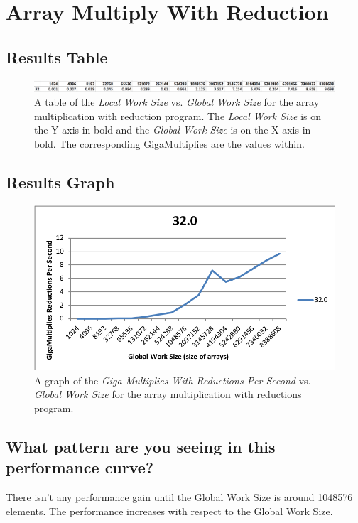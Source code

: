 \documentclass[onecolumn,draftclsnofoot, 10pt, compsoc]{IEEEtran}
\begin{document}
\section{Array Multiply With Reduction}
	\subsection{Results Table}
		\begin{figure}[H]
			\includegraphics[width=18cm]{redTable}
			\centering
			\caption{A table of the \textit{Local Work Size} vs. \textit{Global Work Size} for the array multiplication with reduction program.
				The \textit{Local Work Size} is on the Y-axis in bold and the \textit{Global Work Size} is on the X-axis in bold. The corresponding GigaMultiplies are the values within.}
		\end{figure}
	
	
	
	
	
	\subsection{Results Graph}
		\begin{figure}[H]
			\includegraphics[width=16cm]{redGlobal}
			\centering
			\caption{A graph of the \textit{Giga Multiplies With Reductions Per Second} vs. \textit{Global Work Size} for the array multiplication with reductions program.}
		\end{figure}




	
	
	
	\subsection{What pattern are you seeing in this performance curve?}
		There isn't any performance gain until the Global Work Size is around 1048576 elements.
		The performance increases with respect to the Global Work Size.
	
\end{document}
